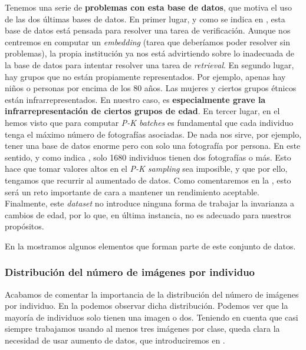 Tenemos una serie de \textbf{problemas con esta base de datos}, que motiva el uso de las dos últimas bases de datos. En primer lugar, y como se indica en \cite{informatica:lfw_dataset}, esta base de datos está pensada para resolver una tarea de verificación. Aunque nos centremos en computar un \textit{embedding} (tarea que deberíamos poder resolver sin problemas), la propia institución ya nos está advirtiendo sobre lo inadecuada de la base de datos para intentar resolver una tarea de \textit{retrieval}. En segundo lugar, hay grupos que no están propiamente representados. Por ejemplo, apenas hay niños o personas por encima de los 80 años. Las mujeres y ciertos grupos étnicos están infrarrepresentados. En nuestro caso, es \textbf{especialmente grave la infrarrepresentación de ciertos grupos de edad}. En tercer lugar, en el  hemos visto que para computar \textit{P-K batches} es fundamental que cada individuo tenga el máximo número de fotografías asociadas. De nada nos sirve, por ejemplo, tener una base de datos enorme pero con solo una fotografía por persona. En este sentido, y como indica \cite{informatica:lfw_dataset}, solo 1680 individuos tienen dos fotografías o más. Esto hace que tomar valores altos en el \textit{P-K sampling} sea imposible, y que por ello, tengamos que recurrir al aumentado de datos. Como comentaremos en la , esto será un reto importante de cara a mantener un rendimiento aceptable. Finalmente, este \textit{dataset} no introduce ninguna forma de trabajar la invarianza a cambios de edad, por lo que, en última instancia, no es adecuado para nuestros propósitos.

En la  mostramos algunos elementos que forman parte de este conjunto de datos.

\subsubsection{Distribución del número de imágenes por individuo} \label{isubsubs:imagenes_por_clase_lfw}

Acabamos de comentar la importancia de la distribución del número de imágenes por individuo. En la  podemos observar dicha distribución. Podemos ver que la mayoría de individuos solo tienen una imagen o dos. Teniendo en cuenta que casi siempre trabajamos usando al menos tres imágenes por clase, queda clara la necesidad de usar aumento de datos, que introduciremos en .

